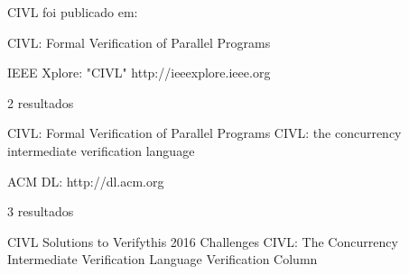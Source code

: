 CIVL foi publicado em:

CIVL: Formal Verification of Parallel Programs

IEEE Xplore: "CIVL"
http://ieeexplore.ieee.org

2 resultados

CIVL: Formal Verification of Parallel Programs
CIVL: the concurrency intermediate verification language

ACM DL:
http://dl.acm.org

3 resultados

CIVL Solutions to Verifythis 2016 Challenges
CIVL: The Concurrency Intermediate Verification Language
Verification Column
